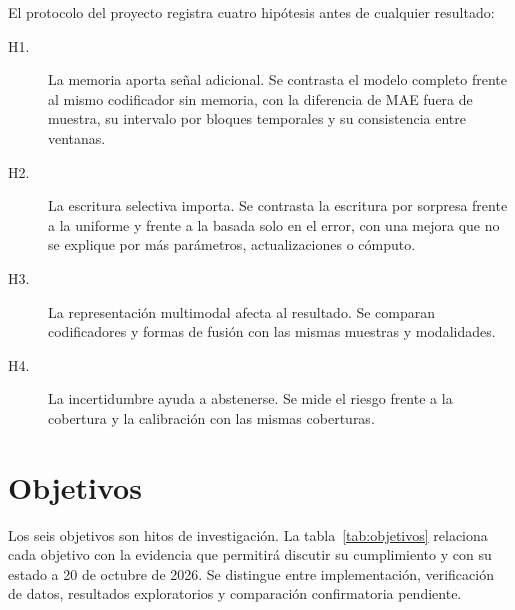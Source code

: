 \documentclass[11pt,a4paper]{report}
\begin{document}
El protocolo del proyecto registra cuatro hipótesis antes de cualquier
resultado:
\begin{description}
\item[H1.] La memoria aporta señal adicional. Se contrasta el modelo completo
frente al mismo codificador sin memoria, con la diferencia de MAE fuera de
muestra, su intervalo por bloques temporales y su consistencia entre ventanas.
\item[H2.] La escritura selectiva importa. Se contrasta la escritura por
sorpresa frente a la uniforme y frente a la basada solo en el error, con una
mejora que no se explique por más parámetros, actualizaciones o cómputo.
\item[H3.] La representación multimodal afecta al resultado. Se comparan
codificadores y formas de fusión con las mismas muestras y modalidades.
\item[H4.] La incertidumbre ayuda a abstenerse. Se mide el riesgo frente a la
cobertura y la calibración con las mismas coberturas.
\end{description}

\section{Objetivos}
Los seis objetivos son hitos de investigación. La tabla~\ref{tab:objetivos} relaciona
cada objetivo con la evidencia que permitirá discutir su cumplimiento y con su
estado a 20 de octubre de 2026. Se distingue entre implementación, verificación
de datos, resultados exploratorios y comparación confirmatoria pendiente.
\end{document}
